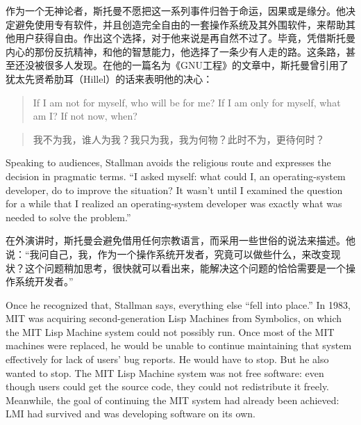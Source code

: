 \ifdefined\chs
作为一个无神论者，斯托曼不愿把这一系列事件归咎于命运，因果或是缘分。他决定避免使用专有软件，并且创造完全自由的一套操作系统及其外围软件，来帮助其他用户获得自由。作出这个选择，对于他来说是再自然不过了。毕竟，凭借斯托曼内心的那份反抗精神，和他的智慧能力，他选择了一条少有人走的路。这条路，甚至还没被很多人发现。在他的一篇名为《GNU工程》的文章中，斯托曼曾引用了犹太先贤希肋耳（Hillel）的话来表明他的决心：
\fi

\ifdefined\eng
\begin{quote}
If I am not for myself, who will be for me? If I am only for myself, what am I? If not now, when?
\end{quote}
\fi

\ifdefined\chs
\begin{quote}
我不为我，谁人为我？我只为我，我为何物？此时不为，更待何时？
\end{quote}
\fi

\ifdefined\eng
Speaking to audiences, Stallman avoids the religious route and expresses the decision in pragmatic terms. ``I asked myself: what could I, an operating-system developer, do to improve the situation? It wasn't until I examined the question for a while that I realized an operating-system developer was exactly what was needed to solve the problem.''
\fi

\ifdefined\chs
在外演讲时，斯托曼会避免借用任何宗教语言，而采用一些世俗的说法来描述。他说：``我问自己，我，作为一个操作系统开发者，究竟可以做些什么，来改变现状？这个问题稍加思考，很快就可以看出来，能解决这个问题的恰恰需要是一个操作系统开发者。''
\fi

\ifdefined\eng
Once he recognized that, Stallman says, everything else ``fell into place.'' In 1983, MIT was acquiring second-generation Lisp Machines from Symbolics, on which the MIT Lisp Machine system could not possibly run.  Once most of the MIT machines were replaced, he would be unable to continue maintaining that system effectively for lack of users' bug reports.  He would have to stop.  But he also wanted to stop.  The MIT Lisp Machine system was not free software: even though users could get the source code, they could not redistribute it freely.  Meanwhile, the goal of continuing the MIT system had already been achieved: LMI had survived and was developing software on its own.
\fi

